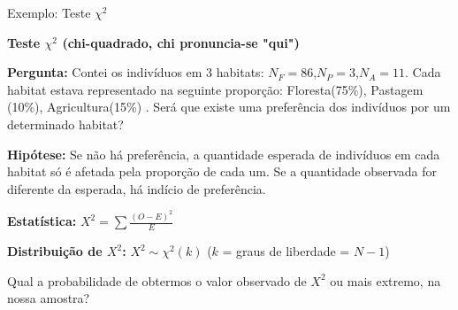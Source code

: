 \documentclass{beamer}
\begin{document}
\begin{frame}{Exemplo: Teste $\chi^2$}


\textbf{Teste  $\chi^2$ (chi-quadrado, chi pronuncia-se "qui")}

\begin{footnotesize}

\textbf{Pergunta:} Contei os indivíduos em 3 habitats: $N_F=86$,$N_P=3$,$N_A=11$. Cada habitat estava representado na seguinte proporção: Floresta(75\%), Pastagem (10\%), Agricultura(15\%) . Será que existe uma preferência dos indivíduos por um determinado habitat?


\textbf{Hipótese:} Se não há preferência, a quantidade esperada de indivíduos em cada habitat só é afetada  pela proporção de cada um. Se a quantidade observada for diferente da esperada, há indício de preferência.


\textbf{Estatística:} $X^2 = \sum{\frac{(O-E)^2}{E}}$

\textbf{Distribuição de $X^2$:} $X^2 \sim \chi^2(k)$ ($k$ =  graus de liberdade = $N -1$)


Qual a probabilidade de obtermos o valor observado de $X^2$ ou mais extremo, na nossa amostra?


\end{footnotesize}

\end{frame} 
\end{document}
